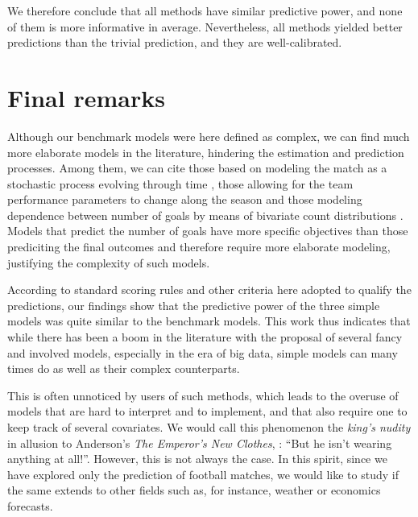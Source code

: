 \documentclass[journal,article,accept,moreauthors,pdftex,12pt,a4paper]{mdpi}
\begin{document}
    We therefore conclude that all methods have similar predictive power, and none of them is more informative in average.
    Nevertheless, all methods yielded better predictions than the trivial prediction, and they are well-calibrated.

    \section{Final remarks}
    \label{sec::remarks}

    Although our benchmark models were here defined as complex, we can find much more elaborate models in the literature, hindering the estimation and prediction processes.
    Among them, we can cite those based on modeling the match as a stochastic process evolving through time \citep{Dixon98, Volf2009, Titman2015}, those allowing for the team performance parameters to change along the season \citep{Rue2000, Crowder2002, Owen2011, Koopman2015} and those modeling dependence between number of goals by means of bivariate count distributions \citep{Dixon97, Karlis2003, McHale2007, McHale2011}. {\color{red} Models that predict the number of goals have more specific objectives than those prediciting the final outcomes and therefore require more elaborate modeling, justifying the complexity of such models}. 

    According to standard scoring rules and other criteria here adopted to qualify the predictions, our findings show that the predictive power of the three simple models was quite similar to the benchmark models.
    This work thus indicates that while there has been a boom in the literature with the proposal of several fancy and involved models, especially in the era of big data, simple models can many times do
    as well as their complex counterparts.

    This is often unnoticed by users of such methods, which leads to the overuse of models that are
    hard to interpret and to implement, and that also require one to keep track of several covariates. We would call this phenomenon the {\it king's nudity} {\color{red} in allusion to Anderson's {\it The Emperor's New Clothes}, \cite{emperor}: ``But he isn't wearing anything at all!''}. However, this is not always the case. In this spirit, since we have explored only the prediction of football matches, we would like to study if the same extends to other fields such as, for instance, weather or economics forecasts.
\end{document}
